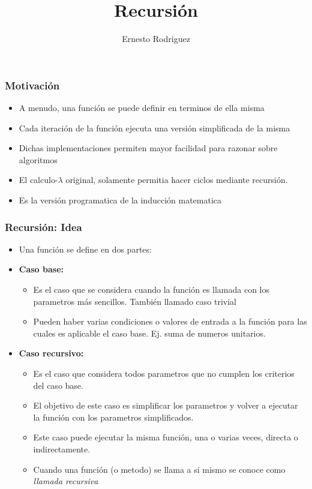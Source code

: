 \documentclass{beamer}
\title[Git]{Recursi\'on}
\author{Ernesto Rodriguez}
\institute{
    Universidad del Itsmo \\
    \medskip \textit{erodriguez@unis.edu.gt}
}
\date[\today]{}
\begin{document}
\begin{frame}
\titlepage
\end{frame}

\begin{frame}
    \frametitle{Motivaci\'on}
    \begin{itemize}
        \item{A menudo, una funci\'on se puede definir en terminos de ella misma}
        \item{Cada iteraci\'on de la funci\'on ejecuta una versi\'on simplificada de la misma}
        \item{Dichas implementaciones permiten mayor facilidad para razonar sobre algoritmos}
        \item{El calculo-$\lambda$ original, solamente permitia hacer ciclos mediante
        recursi\'on.}
        \item{Es la versi\'on programatica de la inducci\'on matematica}
    \end{itemize}
\end{frame}

\begin{frame}
    \frametitle{Recursi\'on: Idea}
    \begin{itemize}
        \item{Una funci\'on se define en dos partes:}
        \item{{\bf Caso base:}
            \begin{itemize}
                \item{Es el caso que se considera cuando la funci\'on
                es llamada con los parametros m\'as sencillos. Tambi\'en llamado caso trivial}
                \item{Pueden haber varias condiciones o valores de entrada a la funci\'on para
                las cuales es aplicable el caso base. Ej. suma de numeros unitarios.}
            \end{itemize}
        }
        \item{{\bf Caso recursivo:}
            \begin{itemize}
                \item{Es el caso que considera todos parametros que no cumplen los
                criterios del caso base.}
                \item{El objetivo de este caso es simplificar los parametros y volver
                a ejecutar la funci\'on con los parametros simplificados.}
                \item{Este caso puede ejecutar la misma funci\'on, una o varias veces,
                directa o indirectamente.}
                \item{Cuando una funci\'on (o metodo) se llama a si mismo se conoce
                como \emph{llamada recursiva}}
            \end{itemize}
        }

    \end{itemize}
\end{frame}
\end{document}

